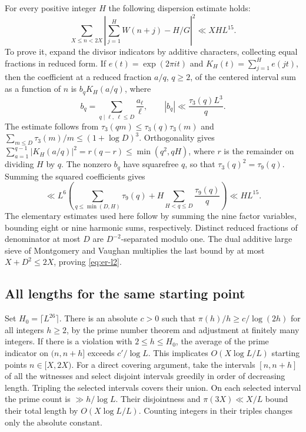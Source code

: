 \documentclass[11pt,a4paper]{article}
\begin{document}
For every positive integer $H$ the following dispersion estimate holds:
\begin{equation}\label{eq:er-l2}
 \sum_{X\le n<2X}
 \left|\sum_{j=1}^{H}W(n+j)-H/G\right|^2
 \ll X H L^{15}.
\end{equation}
To prove it, expand the divisor indicators by additive characters,
collecting equal fractions in reduced form. If $e(t)=\exp(2\pi it)$
and $K_H(t)=\sum_{j=1}^H e(jt)$, then the coefficient at a reduced
fraction $a/q$, $q\ge2$, of the centered interval sum as a function
of $n$ is $b_q K_H(a/q)$, where
\[
 b_q=\sum_{q\mid\ell,\ \ell\le D}\frac{a_\ell}{\ell},\qquad
 |b_q|\ll \frac{\tau_3(q)L^3}{q}.
\]
The estimate follows from $\tau_3(qm)\le\tau_3(q)\tau_3(m)$ and
$\sum_{m\le D}\tau_3(m)/m\le(1+\log D)^3$. Orthogonality gives
$\sum_{a=1}^{q-1}|K_H(a/q)|^2=r(q-r)\le\min(q^2,qH)$,
where $r$ is the remainder on dividing $H$ by $q$.
The nonzero $b_q$ have squarefree $q$, so that
$\tau_3(q)^2=\tau_9(q)$. Summing the squared coefficients gives
\[
 \ll L^6\left(\sum_{q\le\min(D,H)}\tau_9(q)
             +H\sum_{H<q\le D}\frac{\tau_9(q)}{q}\right)\ll HL^{15}.
\]
The elementary estimates used here follow by summing the nine
factor variables, bounding eight or nine harmonic sums, respectively.
Distinct reduced fractions of denominator at most $D$ are
$D^{-2}$-separated modulo one. The dual additive large sieve
of Montgomery and Vaughan \cite{ls} multiplies the last bound by
at most $X+D^2\le2X$, proving \eqref{eq:er-l2}.

\subsection{All lengths for the same starting point}
Set $H_0=\lceil L^{26}\rceil$. There is an absolute $c>0$ such that
$\pi(h)/h\ge c/\log(2h)$ for all integers $h\ge2$, by the prime
number theorem and adjustment at finitely many integers. If there is
a violation with $2\le h\le H_0$, the average of the prime indicator
on $(n,n+h]$ exceeds $c'/\log L$. This implicates
$O(X\log L/L)$ starting points $n\in[X,2X)$. For a direct covering
argument, take the intervals $[n,n+h]$ of all the witnesses and
select disjoint intervals greedily in order of decreasing length.
Tripling the selected intervals covers their union. On each selected
interval the prime count is $\gg h/\log L$. Their disjointness and
$\pi(3X)\ll X/L$ bound their total length by $O(X\log L/L)$.
Counting integers in their triples changes only the absolute constant.
\end{document}
